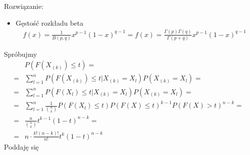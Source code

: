 Rozwiązanie:
\begin{itemize}
\item Gęstość rozkładu beta
\begin{gather*}
f(x)=\frac{1}{B (p,q)}x^{p-1}(1-x)^{q-1}=
f(x)=\frac{\Gamma(p)\Gamma(q)}{\Gamma(p+q)}x^{p-1}(1-x)^{q-1}
\end{gather*}
\end{itemize}
Spróbujmy
\begin{align*}
&P\left(F\left(X_{(k)}\right)\le t\right)
=\\=&
\sum_{l=1}^{n}P\left(F\left(X_{(k)}\right)\le t|X_{(k)}=X_l\right)P\left(X_{(k)}=X_l\right)
=\\=&
\sum_{l=1}^{n}P\left(F\left(X_l\right)\le t|X_{(k)}=X_l\right)P\left(X_{(k)}=X_l\right)
=\\=&
\sum_{l=1}^{n}\frac{1}{\binom{n}{k}}P\left(F(X_l)\le t\right)P\left(F(X)\le t\right)^{k-1}P\left(F(X)>t\right)^{n-k}
=\\=&
\frac{n}{\binom{n}{k}}t^{k-1}\left(1-t\right)^{n-k}
=\\=&
n\cdot \frac{k!(n-k)!}{n!}t^k\left(1-t\right)^{n-k}
\end{align*}
Poddaję się


